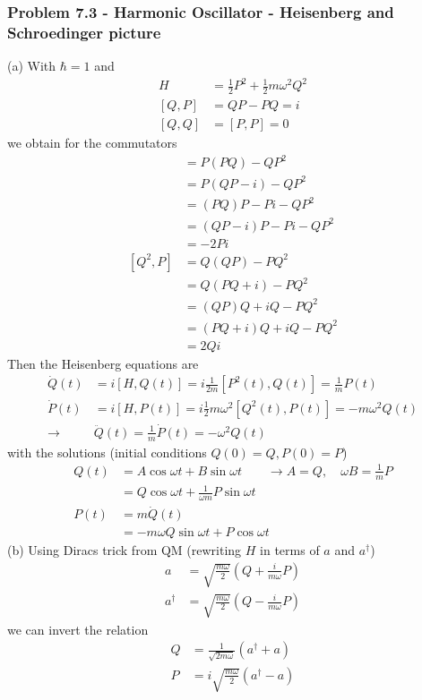 \documentclass[10pt,a4paper]{book}
\theoremstyle{definition}
\begin{document}
\subsubsection{Problem 7.3 - Harmonic Oscillator  - Heisenberg and Schroedinger picture}
(a) With $\hbar=1$ and
\begin{align}
H&=\frac{1}{2}P^2+\frac{1}{2}m\omega^2Q^2\\
[Q,P]&=QP-PQ=i\\
[Q,Q]&=[P,P]=0
\end{align}
we obtain for the commutators
\begin{align}
[P^2,Q]
&=P(PQ)-QP^2\\
&=P(QP-i)-QP^2\\
&=(PQ)P-Pi-QP^2\\
&=(QP-i)P-Pi-QP^2\\
&=-2Pi\\
[Q^2,P]
&=Q(QP)-PQ^2\\
&=Q(PQ+i)-PQ^2\\
&=(QP)Q+iQ-PQ^2\\
&=(PQ+i)Q+iQ-PQ^2\\
&=2Qi
\end{align}
Then the Heisenberg equations are
\begin{align}
\dot Q(t)&=i[H,Q(t)]=i\frac{1}{2m}[P^2(t),Q(t)]=\frac{1}{m}P(t)\\
\dot P(t)&=i[H,P(t)]=i\frac{1}{2}m\omega^2[Q^2(t),P(t)]=-m\omega^2Q(t)\\
\rightarrow &\ddot Q(t)=\frac{1}{m}\dot P(t)=-\omega^2 Q(t)
\end{align}
with the solutions (initial conditions $Q(0)=Q, P(0)=P$)
\begin{align}
Q(t)&=A\cos\omega t+B\sin\omega t\qquad\rightarrow A=Q,\quad\omega B=\frac{1}{m}P\\
&=Q\cos\omega t+\frac{1}{\omega m}P\sin\omega t\\
P(t)&=m\dot Q(t)\\
&=-m\omega Q\sin\omega t+P\cos\omega t
\end{align}
(b) Using Diracs trick from QM (rewriting $H$ in terms of $a$ and $a^\dagger$)
\begin{align}
a&=\sqrt{\frac{m\omega}{2}}(Q+\frac{i}{m\omega}P)\\
a^\dagger&=\sqrt{\frac{m\omega}{2}}(Q-\frac{i}{m\omega}P)
\end{align}
we can invert the relation
\begin{align}
Q&=\frac{1}{\sqrt{2m\omega}}(a^\dagger+a)\\
P&=i\sqrt{\frac{m\omega}{2}}(a^\dagger-a)
\end{align}
\end{document}
